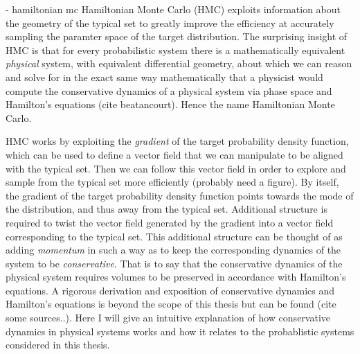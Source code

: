 - hamiltonian mc
Hamiltonian Monte Carlo (HMC) exploits information about the geometry of the typical set to greatly improve the efficiency at accurately sampling the paramter space of the target distribution. The surprising insight of HMC is that for every probabilistic system there is a mathematically equivalent \textit{physical} system, with equivalent differential geometry, about which we can reason and solve for in the exact same way mathematically that a physicist would compute the conservative dynamics of a physical system via phase space and Hamilton's equations (cite beatancourt). Hence the name Hamiltonian Monte Carlo.

HMC works by exploiting the \textit{gradient} of the target probability density function, which can be used to define a vector field that we can manipulate to be aligned with the typical set. Then we can follow this vector field in order to explore and sample from the typical set more efficiently (probably need a figure). By itself, the gradient of the target probability density function points towards the mode of the distribution, and thus away from the typical set. Additional structure is required to twist the vector field generated by the gradient into a vector field corresponding to the typical set. This additional structure can be thought of as adding \textit{momentum} in such a way as to keep the corresponding dynamics of the system to be \textit{conservative}. That is to say that the conservative dynamics of the physical system requires volumes to be preserved in accordance with Hamilton's equations. A rigorous derivation and exposition of conservative dynamics and Hamilton's equations is beyond the scope of this thesis but can be found (cite some sources..). Here I will give an intuitive explanation of how conservative dynamics in physical systems works and how it relates to the probablistic systems considered in this thesis.

